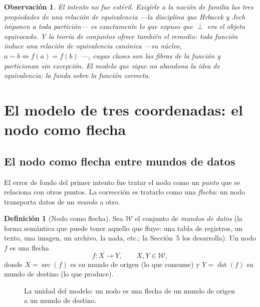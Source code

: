 \documentclass[11pt,a4paper]{article}
\theoremstyle{definition}
\newtheorem{definicion}{Definición}[section]
\theoremstyle{plain}
\newtheorem{observacion}{Observación}[section]
\begin{document}
\begin{observacion}
El intento no fue estéril. Exigirle a la noción de familia las tres propiedades de
una relación de equivalencia ---la disciplina que Hrbacek y Jech~\cite{hrbacek}
imponen a toda partición--- es exactamente lo que expuso que $\perp$ era el objeto
equivocado. Y la teoría de conjuntos ofrece también el remedio: toda función induce
una relación de equivalencia canónica ---su \emph{núcleo}, $a \sim b \iff f(a)=f(b)$
---, cuyas clases son las fibras de la función y particionan sin excepción. El
modelo que sigue no abandona la idea de equivalencia: la funda sobre la función
correcta.
\end{observacion}

\section{El modelo de tres coordenadas: el nodo como flecha}

\subsection{El nodo como flecha entre mundos de datos}

El error de fondo del primer intento fue tratar el nodo como un \emph{punto} que se
relaciona con otros puntos. La corrección es tratarlo como una \emph{flecha}: un
nodo transporta datos de un \emph{mundo} a otro.

\begin{definicion}[Nodo como flecha]
Sea $\mathcal{W}$ el conjunto de \emph{mundos de datos} (la forma semántica que
puede tener aquello que fluye: una tabla de registros, un texto, una imagen, un
archivo, la nada, etc.; la Sección~5 los desarrolla). Un nodo $f$ es una flecha
\[
  f : X \longrightarrow Y, \qquad X,Y \in \mathcal{W},
\]
donde $X=\operatorname{src}(f)$ es su mundo de origen (lo que consume) y
$Y=\operatorname{dst}(f)$ su mundo de destino (lo que produce).
\end{definicion}

\begin{figure}[h]
\centering
{}
\caption{La unidad del modelo: un nodo es una flecha de un mundo de origen a un
mundo de destino.}
\label{fig:arrow}
\end{figure}
\end{document}
